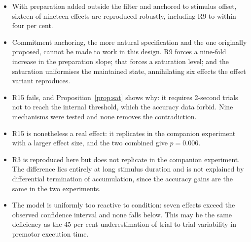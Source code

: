 \documentclass[11pt,a4paper]{article}
\theoremstyle{plain}
\theoremstyle{remark}
\begin{document}
\begin{itemize}
\item With preparation added outside the filter and anchored to stimulus offset, sixteen of
nineteen effects are reproduced robustly, including R9 to within four per cent.
\item Commitment anchoring, the more natural specification and the one originally proposed,
cannot be made to work in this design. R9 forces a nine-fold increase in the preparation
slope; that forces a saturation level; and the saturation uniformises the maintained state,
annihilating six effects the offset variant reproduces.
\item R15 fails, and Proposition~\ref{prop:sat} shows why: it requires 2-second trials not
to reach the internal threshold, which the accuracy data forbid. Nine mechanisms were tested
and none removes the contradiction.
\item R15 is nonetheless a real effect: it replicates in the companion experiment with a
larger effect size, and the two combined give $p=0.006$.
\item R3 is reproduced here but does not replicate in the companion experiment. The
difference lies entirely at long stimulus duration and is not explained by differential
termination of accumulation, since the accuracy gains are the same in the two experiments.
\item The model is uniformly too reactive to condition: seven effects exceed the observed
confidence interval and none falls below. This may be the same deficiency as the 45 per cent
underestimation of trial-to-trial variability in premotor execution time.
\end{itemize}
\end{document}
